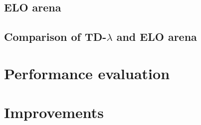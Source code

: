 \documentclass[11pt]{article}
\newcommand{\tdl}{TD-$\lambda$ }
\begin{document}
\subsection{ELO arena}

\subsection{Comparison of \tdl and ELO arena}

\section{Performance evaluation}

\section{Improvements}




\end{document}
